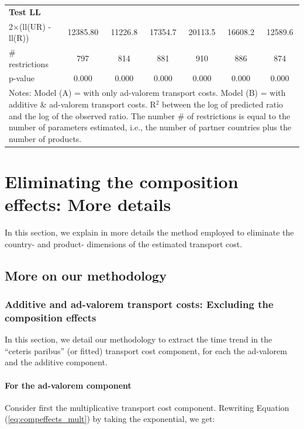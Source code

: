\documentclass[a4paper,11pt]{article}
\begin{document}
\begin{table}[htbp]
\begin{center}
{\begin{tabular}{l|cccccc}
\textbf{Test LL} &       &       & & &  & \\
2$\times$(ll(UR) -ll(R)) & 12385.80 & 11226.8 & \multicolumn{1}{c}{17354.7} & \multicolumn{1}{c}{20113.5} & \multicolumn{1}{c}{16608.2} & \multicolumn{1}{c}{12589.6} \\
\# restrictions  & 797   & 814   & \multicolumn{1}{c}{881} & \multicolumn{1}{c}{910} & \multicolumn{1}{c}{886} & \multicolumn{1}{c}{874} \\
p-value & 0.000 & 0.000 & \multicolumn{1}{c}{0.000} & \multicolumn{1}{c}{0.000} & \multicolumn{1}{c}{0.000} & \multicolumn{1}{c}{0.000} \\
\hline\hline
\multicolumn{7}{l}{\parbox[l]{13cm}{ \vspace{7pt}\scriptsize{Notes: Model (A) = with only ad-valorem transport costs. Model (B) = with additive \& ad-valorem
transport costs. R$^{2}$ between the log of predicted ratio and the log of the observed ratio. The number \# of restrictions is equal to the number of parameters estimated, i.e., the number of partner countries plus the number of products.}}}
\end{tabular}%
}
\end{center}
\end{table}%


\section{Eliminating the composition effects: More details \label{app:comp-effects}}

In this section, we explain in more details the method employed to eliminate the country- and product- dimensions of the estimated transport cost.

\subsection{More on our methodology}


\subsubsection{Additive and ad-valorem transport costs: Excluding the composition effects}

In this section, we detail our methodology to extract the time trend in the ``ceteris paribus'' (or fitted) transport cost component, for each the ad-valorem and the additive component.

\paragraph{For the ad-valorem component} Consider first the multiplicative transport cost component. Rewriting Equation (\ref{eq:compeffects_mult}) by taking the exponential, we get:
\end{document}
